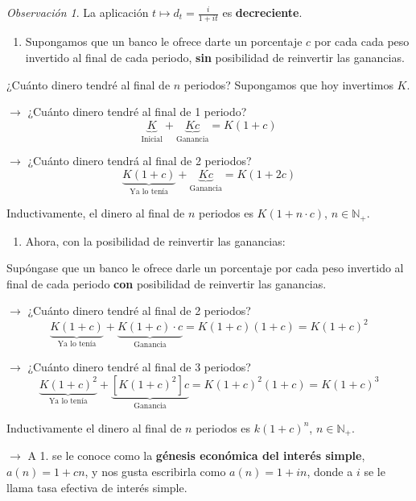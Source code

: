 \documentclass[
]{book}
\providecommand{\tightlist}{%
  \setlength{\itemsep}{0pt}\setlength{\parskip}{0pt}}
\theoremstyle{definition}
\theoremstyle{definition}
\theoremstyle{definition}
\theoremstyle{definition}
\theoremstyle{remark}
\newtheorem*{remark}{Observación }
\begin{document}
\begin{remark}
La aplicación \(t \longmapsto d_t = \frac{i}{1 + it}\) es \textbf{decreciente}.
\end{remark}

\begin{enumerate}
\def\labelenumi{\arabic{enumi})}
\tightlist
\item
  Supongamos que un banco le ofrece darte un porcentaje \(c\) por cada cada peso invertido al final de cada periodo, \textbf{sin} posibilidad de reinvertir las ganancias.
\end{enumerate}

¿Cuánto dinero tendré al final de \(n\) periodos? Supongamos que hoy invertimos \(K\).

\(\longrightarrow\) ¿Cuánto dinero tendré al final de 1 periodo?
\[  \underbrace{K}_{\text{Inicial}} + \underbrace{Kc}_{\text{Ganancia}} = K(1+c)\]

\(\longrightarrow\) ¿Cuánto dinero tendrá al final de 2 periodos?
\[ \underbrace{K(1+c)}_{\text{Ya lo tenía}} + \underbrace{Kc}_{\text{Ganancia}} = K(1+2c)\]

Inductivamente, el dinero al final de \(n\) periodos es \(K(1+n\cdot c)\), \(n\in \mathbb{N}_+\).

\begin{enumerate}
\def\labelenumi{\arabic{enumi})}
\setcounter{enumi}{1}
\tightlist
\item
  Ahora, con la posibilidad de reinvertir las ganancias:
\end{enumerate}

Supóngase que un banco le ofrece darle un porcentaje por cada peso invertido al final de cada periodo \textbf{con} posibilidad de reinvertir las ganancias.

\(\longrightarrow\) ¿Cuánto dinero tendré al final de 2 periodos?
\[ \underbrace{K(1+c)}_{\text{Ya lo tenía}} + \underbrace{K(1+c)\cdot c}_{\text{Ganancia}} = K(1+c)(1+c) = K(1+c)^2\]

\(\longrightarrow\) ¿Cuánto dinero tendré al final de 3 periodos?
\[ \underbrace{K(1+c)^2}_{\text{Ya lo tenía}} + \underbrace{[K(1+c)^2]c}_{\text{Ganancia}} = K(1+c)^2(1+c) = K(1+c)^3\]

Inductivamente el dinero al final de \(n\) periodos es \(k(1+c)^n\), \(n\in \mathbb{N}_+\).

\(\longrightarrow\) A 1. se le conoce como la \textbf{{génesis económica del interés simple}}, \(a(n) = 1+cn\), y nos gusta escribirla como \(a(n) = 1+in\), donde a \(i\) se le llama {tasa efectiva de interés simple.}
\end{document}
